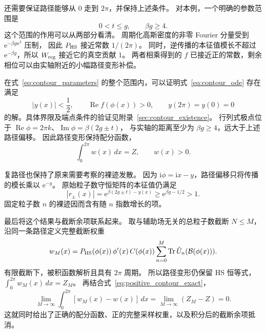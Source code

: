 \documentclass[UTF8,11pt,a4paper,fontset=fandol]{ctexart}
\newcommand{\Tr}{\operatorname{Tr}}
\newcommand{\ee}{\mathrm e}
\newcommand{\ii}{\mathrm i}
\numberwithin{equation}{section}
\begin{document}
还需要保证路径能够从 $0$ 走到 $2\pi$，并保持上述条件。
对本例，一个明确的参数范围是
\begin{equation}
 0<t\le g,\qquad \beta g\ge4.
 \label{eq:contour_parameters}
\end{equation}
这个范围的作用可以从两部分看清。
周期化高斯密度的非零 Fourier 分量受到 $\ee^{-\beta g n^2}$ 压制，
因此 $P_{\rm HS}$ 接近常数 $1/(2\pi)$。
同时，逆传播的本征值模长不超过 $\ee^{-\beta g}$，所以
$W_{\rm reg}$ 接近它的真空贡献 $1$。
两者相乘得到的 $f$ 已接近正的常数，剩余相位可以由实轴附近的小幅路径变形补偿。

在式~\eqref{eq:contour_parameters} 的整个范围内，可以证明式~\eqref{eq:contour_ode} 存在满足
\begin{equation}
 |y(x)|<\frac12,\qquad
 \operatorname{Re}f(\phi(x))>0,\qquad
 y(2\pi)=y(0)=0
 \label{eq:contour_properties}
\end{equation}
的解。具体界限及端点条件的验证见附录~\ref{sec:contour_existence}。
行列式极点位于
$\operatorname{Re}\phi=2\pi k$、$\operatorname{Im}\phi=\beta(2g\pm t)$，
与实轴的距离至少为 $\beta g\ge4$，远大于上述路径偏移。
因此路径变形保持配分函数，
\begin{equation}
 \int_0^{2\pi}w(x)\,dx=Z,\qquad w(x)>0.
 \label{eq:positive_contour_exact}
\end{equation}

复路径也保持了原来需要考察的裸迹发散。
因为 $\ii\phi=\ii x-y$，路径偏移只将传播的模长乘以 $\ee^{-y}$。
原始粒子数守恒矩阵的本征值仍满足
\begin{equation}
 |r_\pm(x)|=\ee^{\beta(2g\pm t)-y(x)}
 \ge\ee^{\beta g-1/2}>1.
 \label{eq:contour_outside}
\end{equation}
固定粒子数 $n$ 的裸迹因而含有随 $n$ 指数增长的项。

最后将这个结果与截断余项联系起来。
取与辅助场无关的总粒子数截断 $N\le M$，沿同一条路径定义完整截断权重
\begin{equation}
 w_M(x)=P_{\rm HS}(\phi(x))\,\phi'(x)\,C(\phi(x))
        \sum_{n=0}^{M}\Tr\hat U_n(\mathcal B(\phi(x))).
\end{equation}
有限截断下，被积函数解析且具有 $2\pi$ 周期。
所以路径变形仍保留 HS 恒等式，$\int_0^{2\pi}w_M(x)\,dx=Z_M$。
再结合式~\eqref{eq:positive_contour_exact}，
\begin{equation}
 \lim_{M\to\infty}\int_0^{2\pi}[w_M(x)-w(x)]\,dx
 =\lim_{M\to\infty}(Z_M-Z)=0.
 \label{eq:contour_remainder}
\end{equation}
这就同时给出了正确的配分函数、正的完整采样权重，以及积分后的截断余项抵消。
\end{document}
